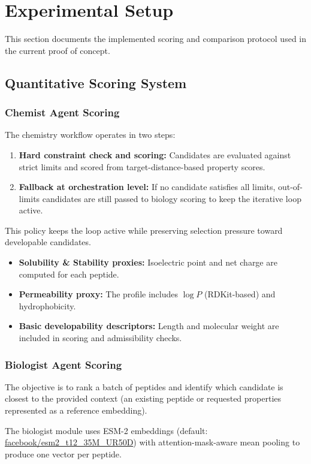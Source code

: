 \section{Experimental Setup}\label{sec:setup}
This section documents the implemented scoring and comparison protocol used in the current proof of concept.

\subsection{Quantitative Scoring System}\label{subsec:scoring}
\subsubsection{Chemist Agent Scoring}
The chemistry workflow operates in two steps:
\begin{enumerate}
    \item \textbf{Hard constraint check and scoring:} Candidates are evaluated against strict limits and scored from target-distance-based property scores.
    \item \textbf{Fallback at orchestration level:} If no candidate satisfies all limits, out-of-limits candidates are still passed to biology scoring to keep the iterative loop active.
\end{enumerate}
This policy keeps the loop active while preserving selection pressure toward developable candidates.

\begin{itemize}
    \item \textbf{Solubility \& Stability proxies:} Isoelectric point and net charge are computed for each peptide.
    \item \textbf{Permeability proxy:} The profile includes $\log P$ (RDKit-based) and hydrophobicity.
    \item \textbf{Basic developability descriptors:} Length and molecular weight are included in scoring and admissibility checks.
\end{itemize}

\subsubsection{Biologist Agent Scoring}
The objective is to rank a batch of peptides and identify which candidate is closest to the provided context (an existing peptide or requested properties represented as a reference embedding).

The biologist module uses ESM-2 embeddings (default: \url{facebook/esm2\_t12\_35M\_UR50D}) with attention-mask-aware mean pooling to produce one vector per peptide.

